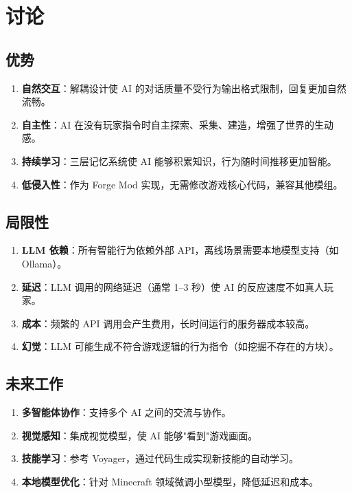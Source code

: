\documentclass[12pt,a4paper]{article}
\begin{document}
\section{讨论}

\subsection{优势}

\begin{enumerate}
    \item \textbf{自然交互}：解耦设计使 AI 的对话质量不受行为输出格式限制，回复更加自然流畅。
    \item \textbf{自主性}：AI 在没有玩家指令时自主探索、采集、建造，增强了世界的生动感。
    \item \textbf{持续学习}：三层记忆系统使 AI 能够积累知识，行为随时间推移更加智能。
    \item \textbf{低侵入性}：作为 Forge Mod 实现，无需修改游戏核心代码，兼容其他模组。
\end{enumerate}

\subsection{局限性}

\begin{enumerate}
    \item \textbf{LLM 依赖}：所有智能行为依赖外部 API，离线场景需要本地模型支持（如 Ollama）。
    \item \textbf{延迟}：LLM 调用的网络延迟（通常 1--3 秒）使 AI 的反应速度不如真人玩家。
    \item \textbf{成本}：频繁的 API 调用会产生费用，长时间运行的服务器成本较高。
    \item \textbf{幻觉}：LLM 可能生成不符合游戏逻辑的行为指令（如挖掘不存在的方块）。
\end{enumerate}

\subsection{未来工作}

\begin{enumerate}
    \item \textbf{多智能体协作}：支持多个 AI 之间的交流与协作。
    \item \textbf{视觉感知}：集成视觉模型，使 AI 能够"看到"游戏画面。
    \item \textbf{技能学习}：参考 Voyager\cite{wang2023voyager}，通过代码生成实现新技能的自动学习。
    \item \textbf{本地模型优化}：针对 Minecraft 领域微调小型模型，降低延迟和成本。
\end{enumerate}
\end{document}
